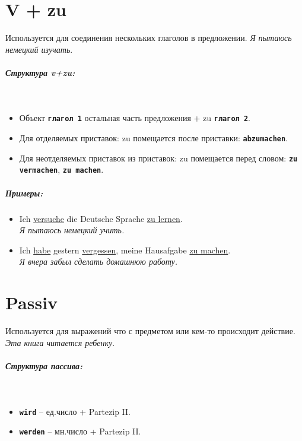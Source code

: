 \documentclass[12pt]{report}
\newcommand{\term}[1]{\texttt{\textbf{#1}}}
\newcommand{\satzew}[1]{\underline{#1}}
\newcommand{\ubersatze}[1]{\textit{#1}}
\begin{document}
\chapter{V + zu}

Используется для соединения нескольких глаголов в предложении. \ubersatze{Я пытаюсь немецкий изучать}.

\paragraph{Структура v+zu:} ~\\
\begin{itemize}
\item Объект \term{глагол 1} остальная часть предложения + zu \term{глагол 2}.
\item Для отделяемых приставок: zu помещается после приставки: \term{abzumachen}.
\item Для неотделяемых приставок из приставок: zu помещается перед словом: \term{zu vermachen}, \term{zu machen}.
\end{itemize}

\paragraph{Примеры:}
\begin{itemize}
\item Ich \satzew{versuche} die Deutsche Sprache \satzew{zu lernen}.
~\\ \ubersatze{Я пытаюсь немецкий учить.}
\item Ich \satzew{habe} gestern \satzew{vergessen}, meine Hausafgabe \satzew{zu machen}.
~\\ \ubersatze{Я вчера забыл сделать домашнюю работу.}
\end{itemize}

\chapter{Passiv}

Используется для выражений что с предметом или кем-то происходит действие. \ubersatze{Эта книга читается ребенку}.

\paragraph{Структура пассива:} ~\\
\begin{itemize}
\item \term{wird} -- ед.число + Partezip II.
\item \term{werden} -- мн.число + Partezip II.
\end{itemize}
\end{document}

